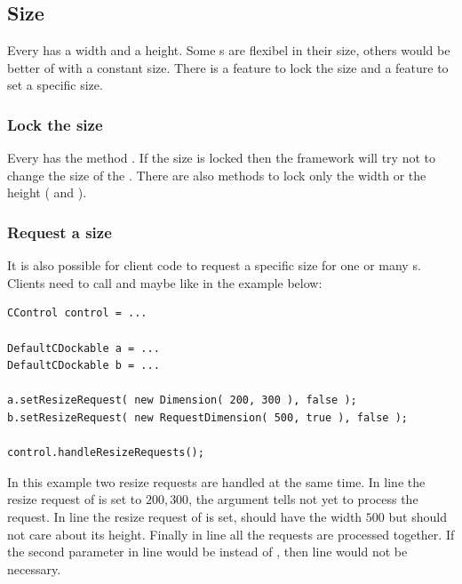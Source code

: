 
\subsection{Size} \label{sec:size}
Every  has a width and a height. Some s are flexibel in their size, others would be better of with a constant size. There is a feature to lock the size and a feature to set a specific size.

\subsubsection{Lock the size}
Every  has the method . If the size is locked then the framework will try not to change the size of the . There are also methods to lock only the width or the height \linebreak ( and ).


\subsubsection{Request a size}
It is also possible for client code to request a specific size for one or many s. Clients need to call  and maybe \linebreak {} like in the example below:

\begin{lstlisting}
CControl control = ...

DefaultCDockable a = ...
DefaultCDockable b = ...

a.setResizeRequest( new Dimension( 200, 300 ), false );
b.setResizeRequest( new RequestDimension( 500, true ), false );

control.handleResizeRequests();
\end{lstlisting}
In this example two resize requests are handled at the same time. In line  the resize request of  is set to $200, 300$, the argument  tells  not yet to process the request. In line  the resize request of  is set,  should have the width $500$ but should not care about its height. Finally in line  all the requests are processed together. If the second parameter in line  would be  instead of , then line  would not be necessary.

